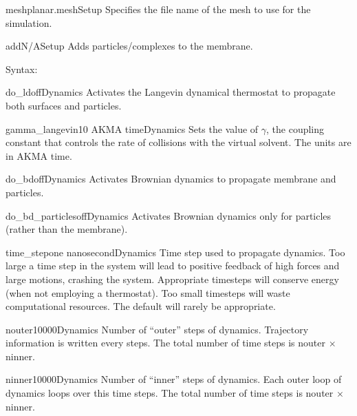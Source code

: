 

\begin{optionSummary}{mesh}{planar.mesh}{Setup}
Specifies the file name of the mesh to use for the simulation.
\end{optionSummary}

\begin{optionSummary}{add}{N/A}{Setup}
Adds particles/complexes to the membrane.

Syntax:
\end{optionSummary}


\begin{optionSummary}{do\_ld}{off}{Dynamics}
Activates the Langevin dynamical thermostat to propagate both surfaces and particles.
\end{optionSummary}
\begin{optionSummary}{gamma\_langevin}{10 AKMA time}{Dynamics}
Sets the value of $\gamma$, the coupling constant that controls the rate of collisions with the virtual solvent. The units are in AKMA time.
\end{optionSummary}
\begin{optionSummary}{do\_bd}{off}{Dynamics}
Activates Brownian dynamics to propagate membrane and particles.
\end{optionSummary}
\begin{optionSummary}{do\_bd\_particles}{off}{Dynamics}
Activates Brownian dynamics only for particles (rather than the membrane).
\end{optionSummary}
\begin{optionSummary}{time\_step}{one nanosecond}{Dynamics}
Time step used to propagate dynamics.
Too large a time step in the system will lead to positive feedback of high forces and large motions, crashing the system.
Appropriate timesteps will conserve energy (when not employing a thermostat).
Too small timesteps will waste computational resources.
The default will rarely be appropriate.
\end{optionSummary}
\begin{optionSummary}{nouter}{10000}{Dynamics}
Number of ``outer'' steps of dynamics.
Trajectory information is written every  steps.
The total number of time steps is nouter $\times$ ninner.
\end{optionSummary}
\begin{optionSummary}{ninner}{10000}{Dynamics}
Number of ``inner'' steps of dynamics.
Each outer loop of dynamics loops over this  time steps.
The total number of time steps is nouter $\times$ ninner.
\end{optionSummary}

